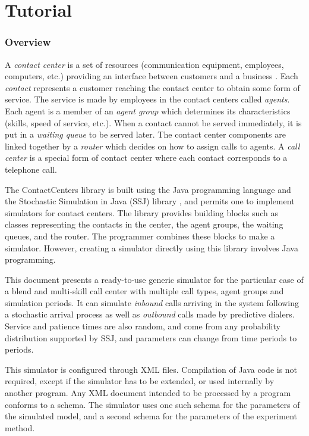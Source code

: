 \part{Tutorial}
\section{Overview}

A \emph{contact center} is a set of resources (communication
equipment, employees, computers, etc.) providing an interface between
customers and a business \cite{ccMEH03a,ccGAN02a,ccAVR05b,ccAKS07a}.
Each \emph{contact} represents a customer reaching the contact center
to obtain some form of service.  The service is made by employees in
the contact centers called \emph{agents}.  Each agent is a member of
an \emph{agent group} which determines its characteristics
(skills, speed of service, etc.).
When a contact cannot be served immediately, it is put in a
\emph{waiting queue} to be served later.  The contact center
components are linked together by a \emph{router} which decides on how
to assign calls to agents.  A \emph{call center} is a
special form of contact center where each contact corresponds to a
telephone call.

The ContactCenters library is built using the Java
programming language \cite{iGOS00a}
and the Stochastic Simulation in Java (SSJ) library \cite{iLEC04j},
and permits one to implement
simulators for
contact centers.  The library provides building blocks such
as classes representing the contacts in the center, the agent groups,
the waiting queues, and the router.  The programmer combines these
blocks to make a simulator.
However, creating a simulator
directly using
this library involves Java programming.

This document presents a
ready-to-use generic simulator for the particular case of a blend and
multi-skill call center with multiple call types, agent groups and
simulation periods.  It can simulate \emph{inbound} calls arriving in
the system following a stochastic arrival process as well
as \emph{outbound} calls made by predictive dialers.  Service and
patience times are also random, and come from
any
probability distribution supported by SSJ, and parameters can change
from time periods to periods.

This simulator is configured
through XML files. Compilation of Java
code is not required, except if the simulator has to be extended,
or used internally by another program.
Any XML document intended to be processed by a program conforms to a
schema.
The simulator uses one such schema for the
parameters of the simulated model, and a
second schema for the parameters of the experiment method.

